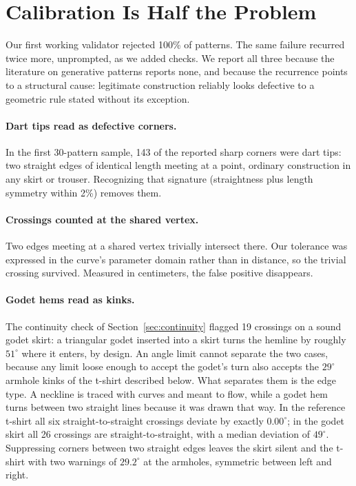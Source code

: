 \documentclass[10pt,twocolumn]{article}
\begin{document}
\section{Calibration Is Half the Problem}
\label{sec:calibration}

Our first working validator rejected 100\% of patterns. The same failure
recurred twice more, unprompted, as we added checks. We report all three
because the literature on generative patterns reports none, and because the
recurrence points to a structural cause: legitimate construction reliably
looks defective to a geometric rule stated without its exception.

\paragraph{Dart tips read as defective corners.} In the first 30-pattern
sample, 143 of the reported sharp corners were dart tips: two straight edges of
identical length meeting at a point, ordinary construction in any skirt or
trouser. Recognizing that signature (straightness plus length symmetry within
2\%) removes them.

\paragraph{Crossings counted at the shared vertex.} Two edges meeting at a
shared vertex trivially intersect there. Our tolerance was expressed in the
curve's parameter domain rather than in distance, so the trivial crossing
survived. Measured in centimeters, the false positive disappears.

\paragraph{Godet hems read as kinks.} The continuity check of
Section~\ref{sec:continuity} flagged 19 crossings on a sound godet skirt: a
triangular godet inserted into a skirt turns the hemline by roughly
$51^\circ$ where it enters, by design. An angle limit cannot separate the two
cases, because any limit loose enough to accept the godet's turn also accepts
the $29^\circ$ armhole kinks of the t-shirt described below. What separates
them is the edge type. A neckline is traced with curves and meant to flow, while a
godet hem turns between two straight lines because it was drawn that way. In
the reference t-shirt all six straight-to-straight crossings deviate by
exactly $0.00^\circ$; in the godet skirt all 26 crossings are
straight-to-straight, with a median deviation of $49^\circ$. Suppressing
corners between two straight edges leaves the skirt silent and the t-shirt
with two warnings of $29.2^\circ$ at the armholes, symmetric between left and
right.
\end{document}
